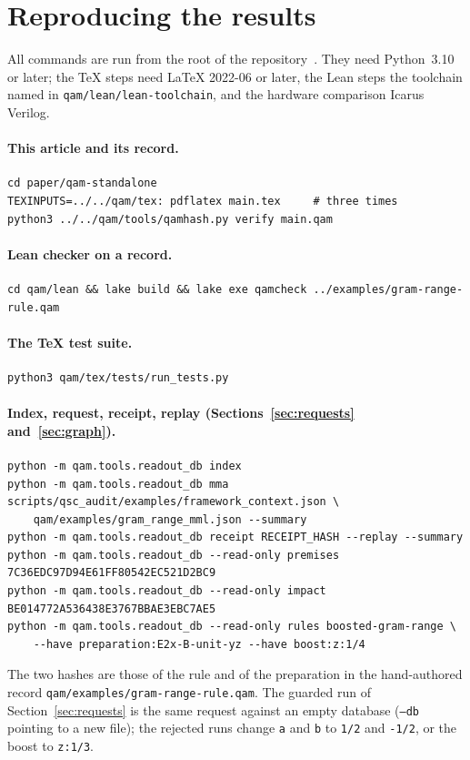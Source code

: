 \section{Reproducing the results}\label{app:repro}

All commands are run from the root of the repository~\cite{repo}. They need Python~3.10 or later; the \TeX{} steps need \LaTeX{}
2022-06 or later, the Lean steps the toolchain named in \texttt{qam/lean/lean-toolchain}, and the hardware comparison Icarus Verilog.

\paragraph{This article and its record.}
\begin{lstlisting}
cd paper/qam-standalone
TEXINPUTS=../../qam/tex: pdflatex main.tex     # three times
python3 ../../qam/tools/qamhash.py verify main.qam
\end{lstlisting}

\paragraph{Lean checker on a record.}
\begin{lstlisting}
cd qam/lean && lake build && lake exe qamcheck ../examples/gram-range-rule.qam
\end{lstlisting}

\paragraph{The \TeX{} test suite.}
\begin{lstlisting}
python3 qam/tex/tests/run_tests.py
\end{lstlisting}

\paragraph{Index, request, receipt, replay (Sections~\ref{sec:requests} and~\ref{sec:graph}).}
\begin{lstlisting}
python -m qam.tools.readout_db index
python -m qam.tools.readout_db mma scripts/qsc_audit/examples/framework_context.json \
    qam/examples/gram_range_mml.json --summary
python -m qam.tools.readout_db receipt RECEIPT_HASH --replay --summary
python -m qam.tools.readout_db --read-only premises 7C36EDC97D94E61FF80542EC521D2BC9
python -m qam.tools.readout_db --read-only impact   BE014772A536438E3767BBAE3EBC7AE5
python -m qam.tools.readout_db --read-only rules boosted-gram-range \
    --have preparation:E2x-B-unit-yz --have boost:z:1/4
\end{lstlisting}
The two hashes are those of the rule and of the preparation in the hand-authored record \texttt{qam/examples/gram-range-rule.qam}.
The guarded run of Section~\ref{sec:requests} is the same request against an empty database (\texttt{--db} pointing to a new file);
the rejected runs change \texttt{a} and \texttt{b} to \texttt{1/2} and \texttt{-1/2}, or the boost to \texttt{z:1/3}.

